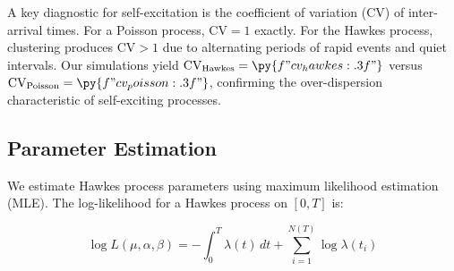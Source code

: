 \documentclass[a4paper, 11pt]{article}
\begin{document}
A key diagnostic for self-excitation is the coefficient of variation (CV) of inter-arrival
times. For a Poisson process, $\text{CV} = 1$ exactly. For the Hawkes process, clustering
produces $\text{CV} > 1$ due to alternating periods of rapid events and quiet intervals.
Our simulations yield $\text{CV}_{\text{Hawkes}} = \py{f"{cv_hawkes:.3f}"}$ versus
$\text{CV}_{\text{Poisson}} = \py{f"{cv_poisson:.3f}"}$, confirming the over-dispersion
characteristic of self-exciting processes.

\subsection{Parameter Estimation}

We estimate Hawkes process parameters using maximum likelihood estimation (MLE).
The log-likelihood for a Hawkes process on $[0, T]$ is:

\begin{equation}
\log L(\mu, \alpha, \beta) = -\int_0^T \lambda(t) \, dt + \sum_{i=1}^{N(T)} \log \lambda(t_i)
\end{equation}
\end{document}
